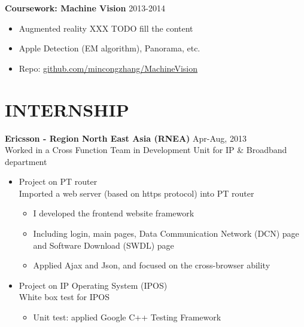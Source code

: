 \documentclass[line,margin]{res}
\begin{document}
\begin{resume}
{\bf Coursework: Machine Vision}
\hfill{\textcolor[rgb]{0.7,0.7,0.7}{2013-2014}}
\begin{itemize}\itemsep -2pt %
    \item Augmented reality XXX TODO fill the content
    \item Apple Detection (EM algorithm), Panorama, etc.
    \item Repo: \href{https://github.com/mincongzhang/MachineVision}{github.com/mincongzhang/MachineVision}
\end{itemize}

\renewcommand{\labelitemi}{$\bullet$}
\renewcommand{\labelitemii}{-}

\section{INTERNSHIP} 
\renewcommand{\labelitemi}{-}



{\bf Ericsson - Region North East Asia (RNEA)}
\hfill{\textcolor[rgb]{0.7,0.7,0.7}{Apr-Aug, 2013}}\\
Worked in a Cross Function Team in Development Unit for IP \& Broadband department

\begin{itemize}
\itemsep -2pt %

    \item Project on PT router\\
    Imported a web server (based on https protocol) into PT router\vspace{-6pt}
    \begin{itemize} \itemsep -2pt
        \item I developed the frontend website framework
        \item Including login, main pages, Data Communication Network (DCN) page and Software Download (SWDL) page
        \item Applied Ajax and Json, and focused on the cross-browser ability
    \end{itemize}
    
    \item Project on IP Operating System (IPOS)\\
    White box test for IPOS\vspace{-6pt}
    \begin{itemize}\itemsep -2pt %
        \item Unit test: applied Google C++ Testing Framework
    \end{itemize}
    

\end{itemize}
\end{resume}
\end{document}
